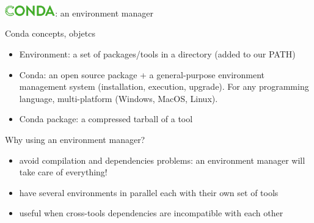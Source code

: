 %
\begin{frame}{\includegraphics[height=0.5cm]{shared/logo-conda.png}: an environment manager}
\begin{block}{Conda concepts, objetcs}
    \begin{itemize}
        \item Environment: a set of packages/tools in a directory (added to our PATH)
        \item Conda: an open source package + a general-purpose environment management system (installation, execution, upgrade). For any programming language, multi-platform (Windows, MacOS, Linux).
        \item Conda package: a compressed tarball of a tool
    \end{itemize}
\end{block}
\begin{block}{Why using an environment manager?}
\begin{itemize}
    \item avoid compilation and dependencies problems: an environment manager will take care of everything!
    \item have several environments in parallel each with their own set of tools
    \item useful when cross-tools dependencies are incompatible with each other
\end{itemize}
\end{block}
\end{frame}
